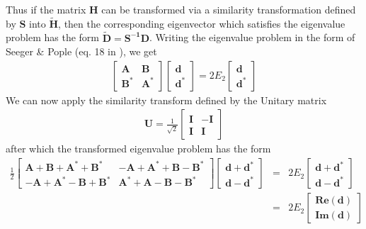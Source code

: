 \documentclass{revtex4}
\begin{document}
Thus if the matrix $\mathbf{H}$ can be transformed via a similarity transformation defined
by $\mathbf{S}$ into $\mathbf{\tilde H}$, then the corresponding eigenvector which satisfies the 
eigenvalue problem
has the form $\mathbf{\tilde D} = \mathbf{S^{-1}D}$.  
Writing the eigenvalue problem in the form of Seeger \& Pople (eq. 18 in \cite{Seeger1977}), 
we get
\begin{eqnarray}
  \begin{bmatrix}
    \mathbf{A} & \mathbf{B} \\
    \mathbf{B^*} & \mathbf{A^*} 
  \end{bmatrix}
  \begin{bmatrix}
    \mathbf{d} \\
    \mathbf{d^*} 
  \end{bmatrix}
  = 2E_2
  \begin{bmatrix}
    \mathbf{d} \\
    \mathbf{d^*} 
  \end{bmatrix}
\end{eqnarray}
We can now apply the similarity transform defined by the Unitary matrix 
\begin{eqnarray}
  \mathbf{U} = \frac{1}{\sqrt{2}}
  \begin{bmatrix}
    \mathbf{I} & -\mathbf{I} \\
    \mathbf{I} & \mathbf{I} 
  \end{bmatrix}
\end{eqnarray}
after which the transformed eigenvalue problem has the form
\begin{eqnarray}
  \frac{1}{2}
  \begin{bmatrix}
    \mathbf{A + B + A^* + B^*} & \mathbf{-A + A^* + B - B^*} \\
    \mathbf{-A + A^* - B + B^*} & \mathbf{A^* + A - B - B^*} 
  \end{bmatrix}
  \begin{bmatrix}
    \mathbf{d + d^*} \\
    \mathbf{d - d^*} 
  \end{bmatrix}
  &=& 2E_2
  \begin{bmatrix}
    \mathbf{d + d^*} \\
    \mathbf{d - d^*} 
  \end{bmatrix} \\
  &=& 2E_2
  \begin{bmatrix}
    \mathbf{Re(d)} \\
    \mathbf{Im(d)} 
  \end{bmatrix}
\end{eqnarray}
\end{document}
